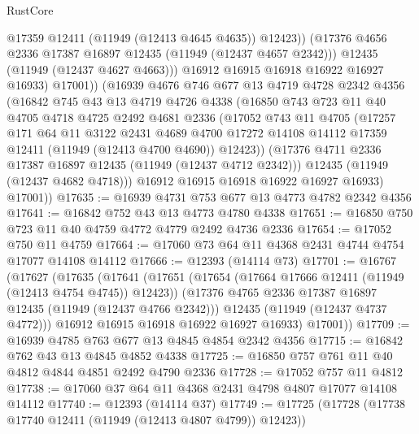 \begin{lexlean}{RustCore}
\begin{coremodule}
                  @17359
                  @12411
                  (@11949 (@12413 @4645 @4635))
                  @12423))
              (@17376 @4656 @2336 @17387 @16897 @12435 (@11949 (@12437 @4657 @2342)))
              @12435
              (@11949 (@12437 @4627 @4663)))
            @16912
            @16915
            @16918
            @16922
            @16927
            @16933)
          @17001))
      (@16939
        @4676
        @746
        @677
        @13
        @4719
        @4728
        @2342
        @4356
        (@16842
          @745
          @43
          @13
          @4719
          @4726
          @4338
          (@16850
            @743
            @723
            @11
            @40
            @4705
            @4718
            @4725
            @2492
            @4681
            @2336
            (@17052
              @743
              @11
              @4705
              (@17257
                @171
                @64
                @11
                @3122
                @2431
                @4689
                @4700
                @17272
                @14108
                @14112
                @17359
                @12411
                (@11949 (@12413 @4700 @4690))
                @12423))
            (@17376 @4711 @2336 @17387 @16897 @12435 (@11949 (@12437 @4712 @2342)))
            @12435
            (@11949 (@12437 @4682 @4718)))
          @16912
          @16915
          @16918
          @16922
          @16927
          @16933)
        @17001))
@17635 := @16939 @4731 @753 @677 @13 @4773 @4782 @2342 @4356
@17641 := @16842 @752 @43 @13 @4773 @4780 @4338
@17651 := @16850 @750 @723 @11 @40 @4759 @4772 @4779 @2492 @4736 @2336
@17654 := @17052 @750 @11 @4759
@17664 := @17060 @73 @64 @11 @4368 @2431 @4744 @4754 @17077 @14108 @14112
@17666 := @12393 (@14114 @73)
@17701 := @16767
    (@17627
      (@17635
        (@17641
          (@17651
            (@17654 (@17664 @17666 @12411 (@11949 (@12413 @4754 @4745)) @12423))
            (@17376 @4765 @2336 @17387 @16897 @12435 (@11949 (@12437 @4766 @2342)))
            @12435
            (@11949 (@12437 @4737 @4772)))
          @16912
          @16915
          @16918
          @16922
          @16927
          @16933)
        @17001))
@17709 := @16939 @4785 @763 @677 @13 @4845 @4854 @2342 @4356
@17715 := @16842 @762 @43 @13 @4845 @4852 @4338
@17725 := @16850 @757 @761 @11 @40 @4812 @4844 @4851 @2492 @4790 @2336
@17728 := @17052 @757 @11 @4812
@17738 := @17060 @37 @64 @11 @4368 @2431 @4798 @4807 @17077 @14108 @14112
@17740 := @12393 (@14114 @37)
@17749 := @17725 (@17728 (@17738 @17740 @12411 (@11949 (@12413 @4807 @4799)) @12423))

\end{coremodule}
\end{lexlean}

